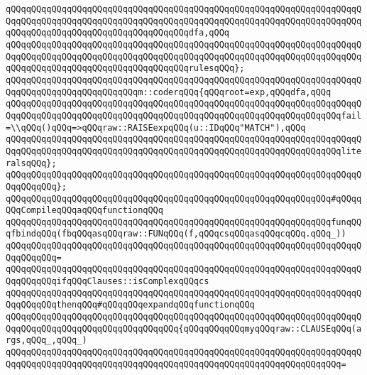 \verb|qQQqqQQqqQQqqQQqqQQqqQQqqQQqqQQqqQQqqQQqqQQqqQQqqQQqqQQqqQQqqQQqqQQqqQQqqQQqqQQqqQQqqQQqqQQqqQQqqQQqqQQqqQQqqQQqqQQqqQQqqQQqqQQqqQQqqQQqqQQqqQQqqQQqqQQqqQQqqQQqqQQqqQQqqQQqqQQqdfa,qQQq|\newline
\verb|qQQqqQQqqQQqqQQqqQQqqQQqqQQqqQQqqQQqqQQqqQQqqQQqqQQqqQQqqQQqqQQqqQQqqQQqqQQqqQQqqQQqqQQqqQQqqQQqqQQqqQQqqQQqqQQqqQQqqQQqqQQqqQQqqQQqqQQqqQQqqQQqqQQqqQQqqQQqqQQqqQQqqQQqqQQqqQQqrulesqQQq};|\newline
\newline
\verb|qQQqqQQqqQQqqQQqqQQqqQQqqQQqqQQqqQQqqQQqqQQqqQQqqQQqqQQqqQQqqQQqqQQqqQQqqQQqqQQqqQQqqQQqqQQqqQQqm::coderqQQq{qQQqroot=exp,qQQqdfa,qQQq|\newline
\verb|qQQqqQQqqQQqqQQqqQQqqQQqqQQqqQQqqQQqqQQqqQQqqQQqqQQqqQQqqQQqqQQqqQQqqQQqqQQqqQQqqQQqqQQqqQQqqQQqqQQqqQQqqQQqqQQqqQQqqQQqqQQqqQQqqQQqqQQqfail=\\qQQq()qQQq=>qQQqraw::RAISEexpqQQq(u::IDqQQq"MATCH"),qQQq|\newline
\verb|qQQqqQQqqQQqqQQqqQQqqQQqqQQqqQQqqQQqqQQqqQQqqQQqqQQqqQQqqQQqqQQqqQQqqQQqqQQqqQQqqQQqqQQqqQQqqQQqqQQqqQQqqQQqqQQqqQQqqQQqqQQqqQQqqQQqqQQqliteralsqQQq};|\newline
\verb|qQQqqQQqqQQqqQQqqQQqqQQqqQQqqQQqqQQqqQQqqQQqqQQqqQQqqQQqqQQqqQQqqQQqqQQqqQQqqQQq};|\newline
\newline
\newline
\verb|qQQqqQQqqQQqqQQqqQQqqQQqqQQqqQQqqQQqqQQqqQQqqQQqqQQqqQQqqQQqqQQq#qQQqqQQqCompileqQQqaqQQqfunctionqQQq|\newline
\newline
\verb|qQQqqQQqqQQqqQQqqQQqqQQqqQQqqQQqqQQqqQQqqQQqqQQqqQQqqQQqqQQqqQQqfunqQQqfbindqQQq(fbqQQqasqQQqraw::FUNqQQq(f,qQQqcsqQQqasqQQqcqQQq.qQQq_))|\newline
\verb|qQQqqQQqqQQqqQQqqQQqqQQqqQQqqQQqqQQqqQQqqQQqqQQqqQQqqQQqqQQqqQQqqQQqqQQqqQQqqQQq=|\newline
\verb|qQQqqQQqqQQqqQQqqQQqqQQqqQQqqQQqqQQqqQQqqQQqqQQqqQQqqQQqqQQqqQQqqQQqqQQqqQQqqQQqifqQQqClauses::isComplexqQQqcs|\newline
\verb|qQQqqQQqqQQqqQQqqQQqqQQqqQQqqQQqqQQqqQQqqQQqqQQqqQQqqQQqqQQqqQQqqQQqqQQqqQQqqQQqthenqQQq#qQQqqQQqexpandqQQqfunctionqQQq|\newline
\newline
\verb|qQQqqQQqqQQqqQQqqQQqqQQqqQQqqQQqqQQqqQQqqQQqqQQqqQQqqQQqqQQqqQQqqQQqqQQqqQQqqQQqqQQqqQQqqQQqqQQqqQQqqQQq{qQQqqQQqqQQqmyqQQqraw::CLAUSEqQQq(args,qQQq_,qQQq_)|\newline
\verb|qQQqqQQqqQQqqQQqqQQqqQQqqQQqqQQqqQQqqQQqqQQqqQQqqQQqqQQqqQQqqQQqqQQqqQQqqQQqqQQqqQQqqQQqqQQqqQQqqQQqqQQqqQQqqQQqqQQqqQQqqQQqqQQqqQQqqQQq=|\newline
